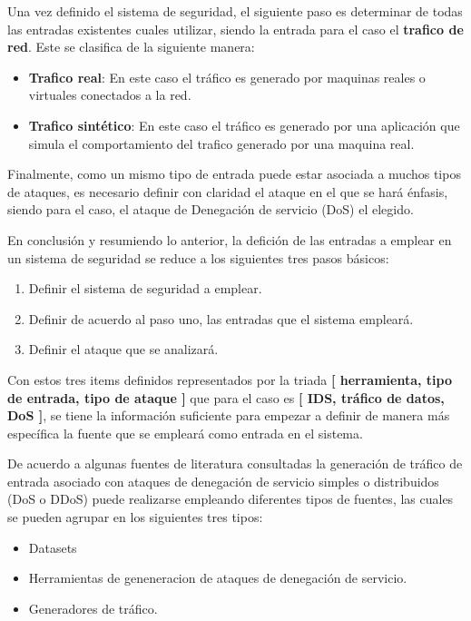 \documentclass[12pt]{article}
\begin{document}
Una vez definido el sistema de seguridad, el siguiente paso es
determinar de todas las entradas existentes cuales utilizar, siendo la
entrada para el caso el \textbf{trafico de red}. Este se clasifica de
la siguiente manera:
\begin{itemize}
\item \textbf{Trafico real}: En este caso el tráfico es generado por
  maquinas reales o virtuales conectados a la red.
\item \textbf{Trafico sintético}: En este caso el tráfico es generado
  por una aplicación que simula el comportamiento del trafico generado
  por una maquina real.
\end{itemize}

Finalmente, como un mismo tipo de entrada puede estar asociada a
muchos tipos de ataques, es necesario definir con claridad el ataque
en el que se hará énfasis, siendo para el caso, el ataque de
Denegación de servicio (DoS) el elegido.

En conclusión y resumiendo lo anterior, la defición de las entradas a
emplear en un sistema de seguridad se reduce a los siguientes tres
pasos básicos:
\begin{enumerate}
\item Definir el sistema de seguridad a emplear.
\item Definir de acuerdo al paso uno, las entradas que el sistema
  empleará.
\item Definir el ataque que se analizará.
\end{enumerate}

Con estos tres items definidos representados por la triada \textbf{[
    herramienta, tipo de entrada, tipo de ataque ]} que para el caso
es \textbf{[ IDS, tráfico de datos, DoS ]}, se tiene la información
suficiente para empezar a definir de manera más específica la fuente
que se empleará como entrada en el sistema.

De acuerdo a algunas fuentes de literatura consultadas
\citep{dos_tools,net_attacks_taxonomy} la generación de tráfico de
entrada asociado con ataques de denegación de servicio simples o
distribuidos (DoS o DDoS) puede realizarse empleando diferentes tipos
de fuentes, las cuales se pueden agrupar en los siguientes tres tipos:
 \begin{itemize}
\item Datasets
\item Herramientas de geneneracion de ataques de denegación de
  servicio.
\item Generadores de tráfico.
\end{itemize}
\end{document}
